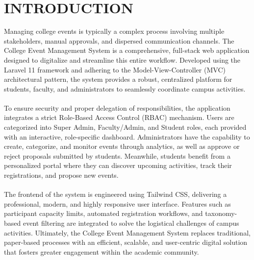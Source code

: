\chapter{INTRODUCTION}

Managing college events is typically a complex process involving multiple stakeholders, manual approvals, and dispersed communication channels. The College Event Management System is a comprehensive, full-stack web application designed to digitalize and streamline this entire workflow. Developed using the Laravel 11 framework and adhering to the Model-View-Controller (MVC) architectural pattern, the system provides a robust, centralized platform for students, faculty, and administrators to seamlessly coordinate campus activities.
\\\\
To ensure security and proper delegation of responsibilities, the application integrates a strict Role-Based Access Control (RBAC) mechanism. Users are categorized into Super Admin, Faculty/Admin, and Student roles, each provided with an interactive, role-specific dashboard. Administrators have the capability to create, categorize, and monitor events through analytics, as well as approve or reject proposals submitted by students. Meanwhile, students benefit from a personalized portal where they can discover upcoming activities, track their registrations, and propose new events.
\\\\
The frontend of the system is engineered using Tailwind CSS, delivering a professional, modern, and highly responsive user interface. Features such as participant capacity limits, automated registration workflows, and taxonomy-based event filtering are integrated to solve the logistical challenges of campus activities. Ultimately, the College Event Management System replaces traditional, paper-based processes with an efficient, scalable, and user-centric digital solution that fosters greater engagement within the academic community.
\\\\

